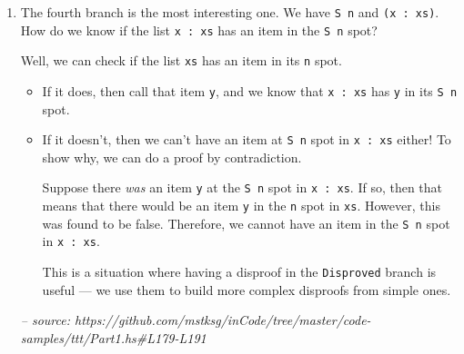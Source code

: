\documentclass[]{article}
\newenvironment{Shaded}{}{}
\newcommand{\CommentTok}[1]{\textcolor[rgb]{0.38,0.63,0.69}{\textit{#1}}}
\newcommand{\DataTypeTok}[1]{\textcolor[rgb]{0.56,0.13,0.00}{#1}}
\newcommand{\FunctionTok}[1]{\textcolor[rgb]{0.02,0.16,0.49}{#1}}
\newcommand{\NormalTok}[1]{#1}
\newcommand{\OtherTok}[1]{\textcolor[rgb]{0.00,0.44,0.13}{#1}}
\begin{document}
\begin{enumerate}
\begin{Shaded}
\end{Shaded}
\item
  The fourth branch is the most interesting one. We have
  \texttt{\textquotesingle{}S\ n} and \texttt{(x\ \textquotesingle{}:\ xs)}. How
  do we know if the list \texttt{x\ \textquotesingle{}:\ xs} has an item in the
  \texttt{\textquotesingle{}S\ n} spot?

  Well, we can check if the list \texttt{xs} has an item in its \texttt{n} spot.

  \begin{itemize}
  \item
    If it does, then call that item \texttt{y}, and we know that
    \texttt{x\ \textquotesingle{}:\ xs} has \texttt{y} in its
    \texttt{\textquotesingle{}S\ n} spot.
  \item
    If it doesn't, then we can't have an item at \texttt{\textquotesingle{}S\ n}
    spot in \texttt{x\ \textquotesingle{}:\ xs} either! To show why, we can do a
    proof by contradiction.

    Suppose there \emph{was} an item \texttt{y} at the
    \texttt{\textquotesingle{}S\ n} spot in \texttt{x\ \textquotesingle{}:\ xs}.
    If so, then that means that there would be an item \texttt{y} in the
    \texttt{n} spot in \texttt{xs}. However, this was found to be false.
    Therefore, we cannot have an item in the \texttt{\textquotesingle{}S\ n}
    spot in \texttt{x\ \textquotesingle{}:\ xs}.

    This is a situation where having a disproof in the \texttt{Disproved} branch
    is useful --- we use them to build more complex disproofs from simple ones.
  \end{itemize}

\begin{Shaded}
\begin{Highlighting}[]
\CommentTok{-- source: https://github.com/mstksg/inCode/tree/master/code-samples/ttt/Part1.hs#L179-L191}


\end{Highlighting}
\end{Shaded}
\end{enumerate}
\end{document}

